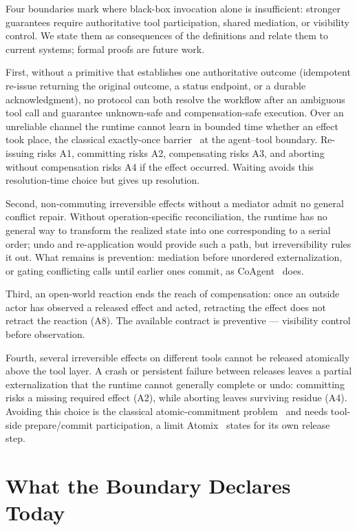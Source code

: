 \documentclass[runningheads]{comsis3}
\begin{document}
Four boundaries mark where black-box invocation alone is insufficient:
stronger guarantees require authoritative tool participation, shared
mediation, or visibility control. We state them as consequences of the
definitions and relate them to current systems; formal proofs are future
work.

First, without a primitive that establishes one authoritative outcome (idempotent re-issue returning the original outcome, a status endpoint, or a durable acknowledgment), no protocol can both resolve the workflow after
an ambiguous tool call and guarantee unknown-safe and compensation-safe
execution. Over an unreliable channel the runtime cannot learn in bounded
time whether an effect took place, the classical exactly-once
barrier~\cite{bernstein1987concurrency} at the agent--tool boundary.
Re-issuing risks A1, committing risks A2, compensating risks A3, and
aborting without compensation risks A4 if the effect occurred. Waiting
avoids this resolution-time choice but gives up resolution.

Second, non-commuting irreversible effects without a mediator admit no
general conflict repair. Without operation-specific reconciliation, the
runtime has no general way to transform the realized state into one
corresponding to a serial order; undo and re-application would provide such
a path, but irreversibility rules it out. What
remains is prevention: mediation before unordered externalization, or gating
conflicting calls until earlier ones commit, as
CoAgent~\cite{lyu2026coagent} does.

Third, an open-world reaction ends the reach of compensation: once an outside
actor has observed a released effect and acted, retracting the effect does
not retract the reaction (A8). The available contract is preventive ---
visibility control before observation.

Fourth, several irreversible effects on different tools cannot be released
atomically above the tool layer. A crash or persistent failure between
releases leaves a partial externalization that the runtime cannot generally
complete or undo: committing risks a missing required effect (A2), while
aborting leaves surviving residue (A4). Avoiding this choice is the
classical atomic-commitment problem~\cite{bernstein1987concurrency} and
needs tool-side prepare/commit participation, a limit
Atomix~\cite{mohammadi2026atomix} states for its own release step.

\section{What the Boundary Declares Today}
\label{sec:grounding}
\end{document}

